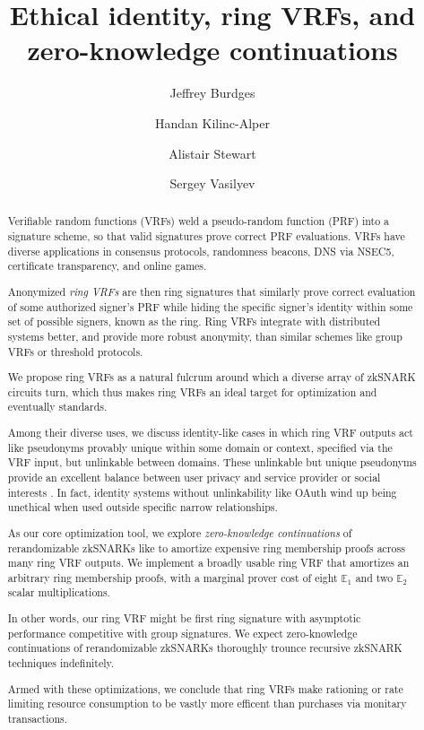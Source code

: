 \documentclass[runningheads,evcountsame,a4paper,11pt,orivec]{llncs}
\title{Ethical identity, ring VRFs, and zero-knowledge continuations}
\author{Jeffrey Burdges \and Handan Kilinc-Alper \and Alistair Stewart \and Sergey Vasilyev}
\date{}
\begin{document}
	
\maketitle

\begin{abstract}
Verifiable random functions (VRFs) weld a pseudo-random function (PRF) into
a signature scheme, so that valid signatures prove correct PRF evaluations.
VRFs have diverse applications in consensus protocols, randomness
beacons, DNS via NSEC5, certificate transparency, and online games.

\smallskip

Anonymized {\em ring VRFs} are then ring signatures that similarly prove
correct evaluation of some authorized signer's PRF while hiding the
specific signer's identity within some set of possible signers,
 known as the ring.
Ring VRFs integrate with distributed systems better, and provide more robust
anonymity, than similar schemes like group VRFs or threshold protocols.


\smallskip %

We propose ring VRFs as a natural fulcrum around which a diverse array of
zkSNARK circuits turn, which thus makes ring VRFs an ideal target
for optimization and eventually standards. 

\smallskip

Among their diverse uses, we discuss identity-like cases in which
ring VRF outputs act like pseudonyms provably unique within some domain or
context, specified via the VRF input, but unlinkable between domains. 
These unlinkable but unique pseudonyms provide an excellent balance between
user privacy and service provider or social interests \cite{pop2008}.
%
In fact, identity systems without unlinkability like OAuth wind up being
unethical when used outside specific narrow relationships.

\smallskip %

As our core optimization tool, we explore {\em zero-knowledge continuations}
of rerandomizable zkSNARKs like \cite{Groth16} to amortize expensive
ring membership proofs across many ring VRF outputs. 
%
We implement a broadly usable ring VRF that amortizes an arbitrary
ring membership proofs, with a marginal prover cost
 of eight $\mathbb{E}_1$ and two $\mathbb{E}_2$ scalar multiplications.

\smallskip

In other words, our ring VRF might be first ring signature with asymptotic
performance competitive with group signatures.
%
We expect zero-knowledge continuations of rerandomizable zkSNARKs
thoroughly trounce recursive zkSNARK techniques indefinitely.

\smallskip

Armed with these optimizations, we conclude that ring VRFs make rationing
or rate limiting resource consumption to be vastly more efficent than
purchases via monitary transactions.
\end{abstract}
\end{document}
